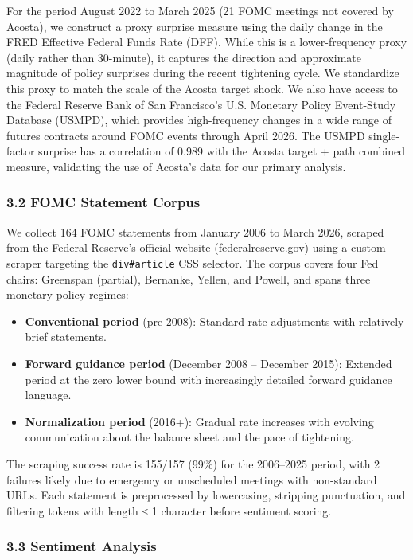 \documentclass[
]{article}
\providecommand{\tightlist}{%
  \setlength{\itemsep}{0pt}\setlength{\parskip}{0pt}}
\begin{document}
For the period August 2022 to March 2025 (21 FOMC meetings not covered
by Acosta), we construct a proxy surprise measure using the daily change
in the FRED Effective Federal Funds Rate (DFF). While this is a
lower-frequency proxy (daily rather than 30-minute), it captures the
direction and approximate magnitude of policy surprises during the
recent tightening cycle. We standardize this proxy to match the scale of
the Acosta target shock. We also have access to the Federal Reserve Bank
of San Francisco's U.S. Monetary Policy Event-Study Database (USMPD),
which provides high-frequency changes in a wide range of futures
contracts around FOMC events through April 2026. The USMPD single-factor
surprise has a correlation of 0.989 with the Acosta target + path
combined measure, validating the use of Acosta's data for our primary
analysis.

\subsubsection{3.2 FOMC Statement Corpus}\label{fomc-statement-corpus}

We collect 164 FOMC statements from January 2006 to March 2026, scraped
from the Federal Reserve's official website (federalreserve.gov) using a
custom scraper targeting the \texttt{div\#article} CSS selector. The
corpus covers four Fed chairs: Greenspan (partial), Bernanke, Yellen,
and Powell, and spans three monetary policy regimes:

\begin{itemize}
\tightlist
\item
  \textbf{Conventional period} (pre-2008): Standard rate adjustments
  with relatively brief statements.
\item
  \textbf{Forward guidance period} (December 2008 -- December 2015):
  Extended period at the zero lower bound with increasingly detailed
  forward guidance language.
\item
  \textbf{Normalization period} (2016+): Gradual rate increases with
  evolving communication about the balance sheet and the pace of
  tightening.
\end{itemize}

The scraping success rate is 155/157 (99\%) for the 2006--2025 period,
with 2 failures likely due to emergency or unscheduled meetings with
non-standard URLs. Each statement is preprocessed by lowercasing,
stripping punctuation, and filtering tokens with length ≤ 1 character
before sentiment scoring.

\subsubsection{3.3 Sentiment Analysis}\label{sentiment-analysis}
\end{document}
